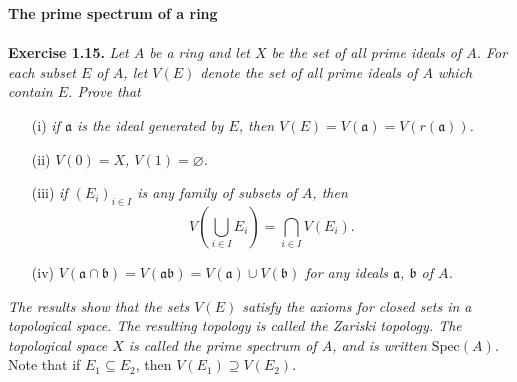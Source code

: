 \documentclass{article}
\begin{document}
\textbf{\large The prime spectrum of a ring} \\\\

\textbf{Exercise 1.15.}
\emph{Let $A$ be a ring and let $X$ be the set of all prime ideals of $A$.
For each subset $E$ of $A$,
let $V(E)$ denote the set of all prime ideals of $A$ which contain $E$.
Prove that}
\begin{enumerate}
\item[(i)]
\emph{if $\mathfrak{a}$ is the ideal generated by $E$,
then $V(E) = V(\mathfrak{a}) = V(r(\mathfrak{a}))$.}
\item[(ii)]
\emph{$V(0) = X$, $V(1) = \varnothing$.}
\item[(iii)]
\emph{if $(E_i)_{i \in I}$ is any family of subsets of $A$,
then
$$V\left( \bigcup_{i \in I}E_i \right) = \bigcap_{i \in I} V(E_i).$$}
\item[(iv)]
\emph{$V(\mathfrak{a} \cap \mathfrak{b})
= V(\mathfrak{a} \mathfrak{b})
= V(\mathfrak{a}) \cup V(\mathfrak{b})$
for any ideals $\mathfrak{a}$, $\mathfrak{b}$ of $A$.}
\end{enumerate}

\emph{The results show that the sets $V(E)$ satisfy
the axioms for closed sets in a topological space.
The resulting topology is called the Zariski topology.
The topological space $X$ is called the prime spectrum of $A$,
and is written $\text{Spec}(A)$.} \\

Note that if $E_1 \subseteq E_2$,
then $V(E_1) \supseteq V(E_2)$. \\
\end{document}
